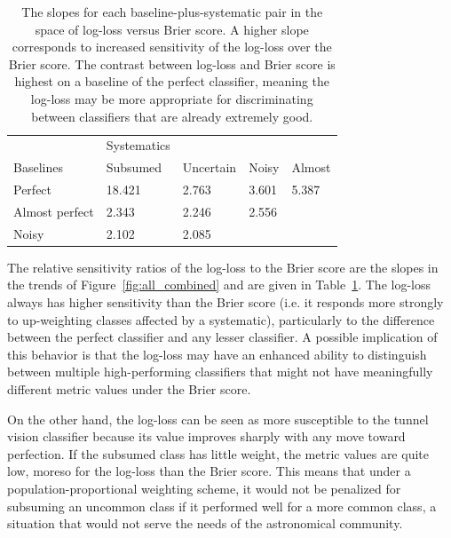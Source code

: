 \begin{table}[]
\begin{tabular}{l|llll}
	& Systematics & & &\\
Baselines & Subsumed & Uncertain & Noisy & Almost\\
\hline
Perfect & 18.421 & 2.763 & 3.601 & 5.387\\
Almost perfect & 2.343 & 2.246 & 2.556 & \\
Noisy & 2.102 & 2.085 & &
\end{tabular}
\caption{
The slopes for each baseline-plus-systematic pair in the space of log-loss versus Brier score.
A higher slope corresponds to increased sensitivity of the log-loss over the Brier score.
The contrast between log-loss and Brier score is highest on a baseline of the perfect classifier, meaning the log-loss may be more appropriate for discriminating between classifiers that are already extremely good.
}
\label{tab:slopes}
\end{table}

The relative sensitivity ratios of the log-loss to the Brier score are the slopes in the trends of Figure~\ref{fig:all_combined} and are given in Table~\ref{tab:slopes}.
The log-loss always has higher sensitivity than the Brier score (i.e. it responds more strongly to up-weighting classes affected by a systematic), particularly to the difference between the perfect classifier and any lesser classifier.
A possible implication of this behavior is that the log-loss may have an enhanced ability to distinguish between multiple high-performing classifiers that might not have meaningfully different metric values under the Brier score.

On the other hand, the log-loss can be seen as more susceptible to the tunnel vision classifier because its value improves sharply with any move toward perfection.
If the subsumed class has little weight, the metric values are quite low, moreso for the log-loss than the Brier score.
This means that under a population-proportional weighting scheme, it would not be penalized for subsuming an uncommon class if it performed well for a more common class, a situation that would not serve the needs of the astronomical community.


